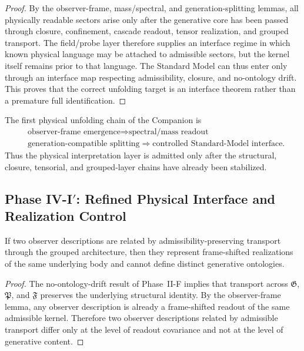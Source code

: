 \begin{proof}
By the observer-frame, mass/spectral, and generation-splitting lemmas, all physically readable sectors arise only after the generative core has been passed through closure, confinement, cascade readout, tensor realization, and grouped transport. The field/probe layer therefore supplies an interface regime in which known physical language may be attached to admissible sectors, but the kernel itself remains prior to that language. The Standard Model can thus enter only through an interface map respecting admissibility, closure, and no-ontology drift. This proves that the correct unfolding target is an interface theorem rather than a premature full identification.
\end{proof}

\begin{corollary}
\label{cor:first-physical-unfolding-chain}
The first physical unfolding chain of the Companion is
\[
\begin{aligned}
&\text{observer-frame emergence}
  \Longrightarrow \text{spectral/mass readout}\\
&\text{generation-compatible splitting}
  \Longrightarrow \text{controlled Standard-Model interface}.
\end{aligned}
\]
Thus the physical interpretation layer is admitted only after the structural, closure, tensorial, and grouped-layer chains have already been stabilized.
\end{corollary}


\subsection*{Phase IV-I$'$: Refined Physical Interface and Realization Control}

\begin{lemma}
\label{lem:observer-covariance-admissible-transport}
If two observer descriptions are related by admissibility-preserving transport through the grouped architecture, then they represent frame-shifted realizations of the same underlying body and cannot define distinct generative ontologies.
\end{lemma}

\begin{proof}
The no-ontology-drift result of Phase~II-F implies that transport across $\mathfrak G$, $\mathfrak P$, and $\mathfrak F$ preserves the underlying structural identity. By the observer-frame lemma, any observer description is already a frame-shifted readout of the same admissible kernel. Therefore two observer descriptions related by admissible transport differ only at the level of readout covariance and not at the level of generative content.
\end{proof}


